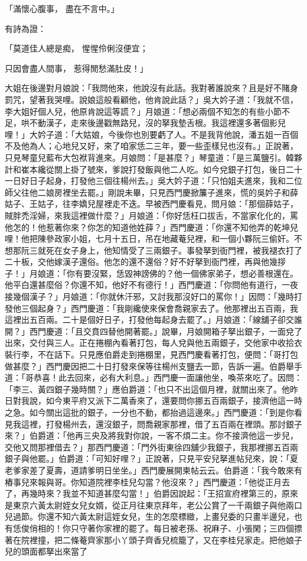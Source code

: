 \begin{showcontents}{}
「滿懷心腹事，  盡在不言中。」

有詩為證：

「莫道佳人總是痴，  惺惺伶俐沒便宜；

只因會盡人間事，  惹得閒愁滿肚皮！」

大姐在後邊對月娘說：「我問他來，他說沒有此話。我對著誰說來？且是好不賭身罰咒，望著我哭哩。說娘這般看顧他，他肯說此話？」吳大妗子道：「我就不信，李大姐好個人兒，他原肯說這等謊？」月娘道：「想必兩個不知怎的有些小節不足，哄不動漢子，走來後邊戳無路兒，沒的拏我墊舌根。我這裡還多著個影兒哩！」大妗子道：「大姑娘，今後你也別要虧了人。不是我背他說，潘五姐一百個不及他為人；心地兒又好，來了咱家恁二三年，要一些歪樣兒也沒有。」正說著，只見琴童兒藍布大包袱背進來。月娘問：「是甚麼？」琴童道：「是三萬鹽引。韓夥計和崔本纔從關上掛了號來，爹說打發飯與他二人吃。如今兌銀子打包，後日二十一日好日子起身，打發他三個往楊州去。」吳大妗子道：「只怕姐夫進來，我和二位師父往他二娘房裡坐去罷。」剛說未畢，只見西門慶掀簾子進來，慌的吳妗子和薛姑子、王姑子，往李嬌兒屋裡走不迭。早被西門慶看見，問月娘：「那個薛姑子，賊胖禿淫婦，來我這裡做什麼？」月娘道：「你好恁枉口拔舌，不當家化化的，罵他怎的！他惹著你來？你怎的知道他姓薛？」西門慶道：「你還不知他弄的乾坤兒哩！他把陳參政家小姐，七月十五日，吊在地藏菴兒裡，和一個小夥阮三偷奸。不想那阮三就死在女子身上，他知情受了三兩銀子。事發拏到衙門裡，被我褪衣打了二十板，交他嫁漢子還俗。他怎的還不還俗？好不好拏到衙門裡，再與他幾拶子！」月娘道：「你有要沒緊，恁毀神謗佛的？他一個佛家弟子，想必善根還在。他平白還甚麼俗？你還不知，他好不有德行！」西門慶道：「你問他有道行，一夜接幾個漢子？」月娘道：「你就休汗邪，又討我那沒好口的罵你！」因問：「幾時打發他三個起身？」西門慶道：「我剛纔使來保會喬親家去了。他那裡出五百兩，我這裡出五百兩。二十是個好日子，打發他每起身去罷了。」月娘道：「線舖子卻交誰開？」西門慶道：「且交賁四替他開著罷。」說畢，月娘開箱子拏出銀子，一面兌了出來，交付與三人。正在捲棚內看著打包，每人兌與他五兩銀子，交他家中收拾衣裝行李，不在話下。只見應伯爵走到捲棚里，見西門慶看著打包，便問：「哥打包做甚麼？」西門慶因把二十日打發來保等往楊州支鹽去一節，告訴一遍。伯爵舉手道：「哥恭喜！此去回來，必有大利息。」西門慶一面讓他坐，喚茶來吃了。因問：「李三、黃四銀子幾時關？」應伯爵道：「也只不出這個月裡，就關出來了。他昨日對我說，如今東平府又派下二萬香來了，還要問你挪五百兩銀子，接濟他這一時之急。如今關出這批的銀子，一分也不動，都抬過這邊來。」西門慶道：「到是你看見我這裡，打發楊州去，還沒銀子，問喬親家那裡，借了五百兩在裡頭。那討銀子來？」伯爵道：「他再三央及將我對你說，一客不煩二主。你不接濟他這一步兒，交他又問那裡借去？」那西門慶道：「門外街東徐四舖少我銀子，我那裡挪五百兩銀子與他罷。」伯爵道：「可知好哩？」正說著，只見平安兒拏進帖兒來，說：「夏老爹家差了夏壽，道請爹明日坐坐。」西門慶展開柬帖云云。伯爵道：「我今敢來有樁事兒來報與哥。你知道院裡李桂兒勾當？他沒來？」西門慶道：「他從正月去了，再幾時來？我並不知道甚麼勾當！」伯爵因說起：「王招宣府裡第三的，原來是東京六黃太尉姪女兒女婿，從正月往東京拜年，老公公賞了一千兩銀子與他兩口兒過節。你還不知六黃太尉這姪女兒，生的怎麼標緻，上畫兒委的只畫半邊兒，也有恁俊俏相的！你只守著你家裡的罷了。每日被老孫、祝麻子、小張閑；三四個摽著在院裡撞，把二條菴齊家那小丫頭子齊香兒梳籠了，又在李桂兒家走。把他娘子兒的頭面都拏出來當了
\end{showcontents}
